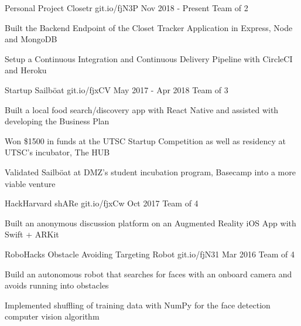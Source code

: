 \begin{cventries}
\cventry
    {Personal Project}
    {Closetr}
    {git.io/fjN3P}
    {Nov 2018 - Present}
    {Team of 2}
    {
      \begin{cvitems}
        \item{Built the Backend Endpoint of the Closet Tracker Application in Express, Node and MongoDB}
        \item{Setup a Continuous Integration and Continuous Delivery Pipeline with CircleCI and Heroku}
      \end{cvitems}
    }
\cventry
  {Startup}
  {Sailböat}
  {git.io/fjxCV}
  {May 2017 - Apr 2018}
  {Team of 3}
  {
    \begin{cvitems}
      \item {Built a local food search/discovery app with React Native and assisted with developing the Business Plan}
      \item {Won \$1500 in funds at the UTSC Startup Competition as well as residency at UTSC's incubator, The HUB}
      \item {Validated Sailböat at DMZ's student incubation program, Basecamp into a more viable venture}
    \end{cvitems}
  }
\cventry
  {HackHarvard}
  {shARe}
  {git.io/fjxCw}
  {Oct 2017}
  {Team of 4}
  {
    \begin{cvitems}
      \item {Built an anonymous discussion platform on an Augmented Reality iOS App with Swift + ARKit}
    \end{cvitems}
  }
\cventry
  {RoboHacks}
  {Obstacle Avoiding Targeting Robot}
  {git.io/fjN31}
  {Mar 2016}
  {Team of 4}
  {
    \begin{cvitems}
      \item {Build an autonomous robot that searches for faces with an onboard camera and avoids running into obstacles}
      \item {Implemented shuffling of training data with NumPy for the face detection computer vision algorithm}
    \end{cvitems}
  }
\end{cventries}
